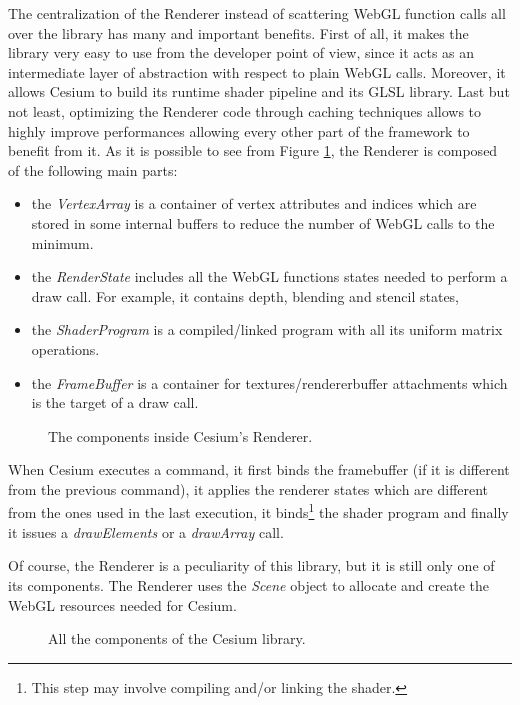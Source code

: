 The centralization of the Renderer instead of scattering WebGL function calls
all over the library has many and important benefits. First of all, it makes the
library very easy to use from the developer point of view, since it acts as an
intermediate layer of abstraction with respect to plain WebGL calls. Moreover,
it allows Cesium to build its runtime shader pipeline and its GLSL library. Last
but not least, optimizing the Renderer code through caching techniques allows
to highly improve performances allowing every other part of the framework to
benefit from it. As it is possible to see from Figure \ref{img:cesium_renderer},
the Renderer is composed of the following main parts:
\begin{itemize}
    \item the \emph{VertexArray} is a container of vertex attributes and indices
        which are stored in some internal buffers to reduce the number of WebGL
        calls to the minimum.
    \item the \emph{RenderState} includes all the WebGL functions states needed to
        perform a draw call. For example, it contains depth, blending and stencil
        states,
    \item the \emph{ShaderProgram} is a compiled/linked program with all its
        uniform matrix operations.
    \item the \emph{FrameBuffer} is a container for textures/rendererbuffer
        attachments which is the target of a draw call.
\end{itemize}

\begin{figure}[!htb]\label{img:cesium_renderer}
    \caption{The components inside Cesium's Renderer.}
\end{figure}

When Cesium executes a command, it first binds the framebuffer (if it is different
from the previous command), it applies the renderer states which are different from
the ones used in the last execution, it binds\footnote{This step may involve
compiling and/or linking the shader.} the shader program and finally it
issues a \emph{drawElements} or a \emph{drawArray} call.

Of course, the Renderer is a peculiarity of this library, but it is still only
one of its components. The Renderer uses the \emph{Scene} object to allocate and
create the WebGL resources needed for Cesium.
\begin{figure}[!htb]\label{img:cesium_stack}
    \caption{All the components of the Cesium library.}
\end{figure}


